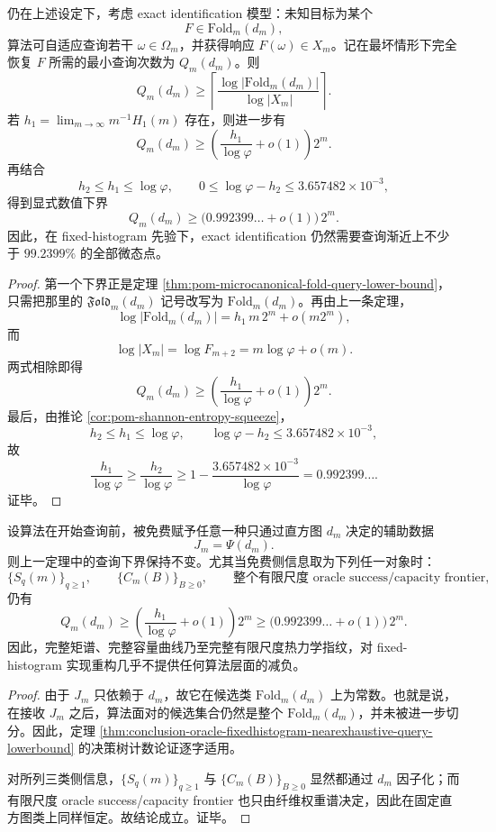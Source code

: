 \begin{theorem}[固定直方图下的近穷举查询下界]\label{thm:conclusion-oracle-fixedhistogram-nearexhaustive-query-lowerbound}
仍在上述设定下，考虑 exact identification 模型：未知目标为某个
\[
F\in \mathrm{Fold}_m(d_m),
\]
算法可自适应查询若干 \(\omega\in\Omega_m\)，并获得响应 \(F(\omega)\in X_m\)。记在最坏情形下完全恢复 \(F\) 所需的最小查询次数为 \(Q_m(d_m)\)。则
\[
Q_m(d_m)\ge
\left\lceil
\frac{\log |\mathrm{Fold}_m(d_m)|}{\log |X_m|}
\right\rceil.
\]
若 \(h_1=\lim_{m\to\infty}m^{-1}H_1(m)\) 存在，则进一步有
\[
Q_m(d_m)\ge
\left(\frac{h_1}{\log\varphi}+o(1)\right)2^m.
\]
再结合
\[
h_2\le h_1\le \log\varphi,
\qquad
0\le \log\varphi-h_2\le 3.657482\times 10^{-3},
\]
得到显式数值下界
\[
Q_m(d_m)\ge \bigl(0.992399\ldots+o(1)\bigr)\,2^m.
\]
因此，在 fixed-histogram 先验下，exact identification 仍然需要查询渐近上不少于 \(99.2399\%\) 的全部微态点。
\end{theorem}
\begin{proof}
第一个下界正是定理 \ref{thm:pom-microcanonical-fold-query-lower-bound}，只需把那里的 \(\mathfrak{Fold}_m(d_m)\) 记号改写为 \(\mathrm{Fold}_m(d_m)\)。再由上一条定理，
\[
\log |\mathrm{Fold}_m(d_m)|=h_1\,m\,2^m+o(m2^m),
\]
而
\[
\log|X_m|=\log F_{m+2}=m\log\varphi+o(m).
\]
两式相除即得
\[
Q_m(d_m)\ge \left(\frac{h_1}{\log\varphi}+o(1)\right)2^m.
\]
最后，由推论 \ref{cor:pom-shannon-entropy-squeeze}，
\[
h_2\le h_1\le \log\varphi,
\qquad
\log\varphi-h_2\le 3.657482\times10^{-3},
\]
故
\[
\frac{h_1}{\log\varphi}
\ge
\frac{h_2}{\log\varphi}
\ge
1-\frac{3.657482\times10^{-3}}{\log\varphi}
=0.992399\ldots.
\]
证毕。
\end{proof}

\begin{theorem}[完整谱侧信息对实现识别的无效性]\label{thm:conclusion-oracle-complete-spectral-sideinfo-nohelp}
设算法在开始查询前，被免费赋予任意一种只通过直方图 \(d_m\) 决定的辅助数据
\[
J_m=\Psi(d_m).
\]
则上一定理中的查询下界保持不变。尤其当免费侧信息取为下列任一对象时：
\[
\{S_q(m)\}_{q\ge 1},
\qquad
\{C_m(B)\}_{B\ge 0},
\qquad
\text{整个有限尺度 oracle success/capacity frontier},
\]
仍有
\[
Q_m(d_m)\ge \left(\frac{h_1}{\log\varphi}+o(1)\right)2^m
\ge
\bigl(0.992399\ldots+o(1)\bigr)\,2^m.
\]
因此，完整矩谱、完整容量曲线乃至完整有限尺度热力学指纹，对 fixed-histogram 实现重构几乎不提供任何算法层面的减负。
\end{theorem}
\begin{proof}
由于 \(J_m\) 只依赖于 \(d_m\)，故它在候选类 \(\mathrm{Fold}_m(d_m)\) 上为常数。也就是说，在接收 \(J_m\) 之后，算法面对的候选集合仍然是整个 \(\mathrm{Fold}_m(d_m)\)，并未被进一步切分。因此，定理 \ref{thm:conclusion-oracle-fixedhistogram-nearexhaustive-query-lowerbound} 的决策树计数论证逐字适用。

对所列三类侧信息，\(\{S_q(m)\}_{q\ge1}\) 与 \(\{C_m(B)\}_{B\ge0}\) 显然都通过 \(d_m\) 因子化；而有限尺度 oracle success/capacity frontier 也只由纤维权重谱决定，因此在固定直方图类上同样恒定。故结论成立。证毕。
\end{proof}

